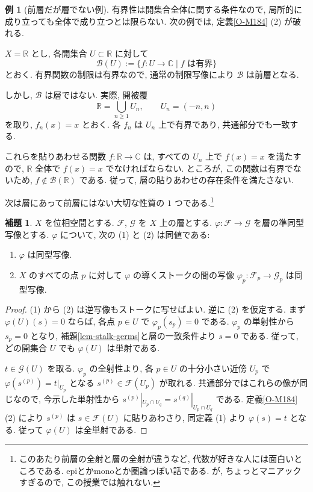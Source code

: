 \documentclass[dvipdfmx,a4paper,11pt]{article} %
\newcommand{\R}{\mathbb{R}}
\newcommand{\C}{\mathbb{C}}
\theoremstyle{definition}
\numberwithin{equation}{section}
\newtheorem{lem}[thm]{補題}
\newtheorem{exa}[thm]{例}
\begin{document}
\begin{exa}[前層だが層でない例]
有界性は開集合全体に関する条件なので, 局所的に成り立っても全体で成り立つとは限らない. 次の例では, 定義\ref{O-M184} (2) が破れる.

$X=\R$ とし, 各開集合 $U\subset\R$ に対して
\[
\mathcal B(U)
:=\{f:U\to\C\mid f\text{ は有界}\}
\]
とおく.
有界関数の制限は有界なので, 通常の制限写像により
$\mathcal B$ は前層となる.

しかし, $\mathcal B$ は層ではない.
実際, 開被覆
\[
\R=\bigcup_{n\geq1}U_n,\qquad U_n=(-n,n)
\]
を取り, $f_n(x)=x$ とおく.
各 $f_n$ は $U_n$ 上で有界であり, 共通部分でも一致する.

これらを貼りあわせる関数 $f:\R\to\C$ は, 
すべての $U_n$ 上で $f(x)=x$ を満たすので, 
$\R$ 全体で $f(x)=x$ でなければならない.
ところが, この関数は有界でないため, 
$f\notin\mathcal B(\R)$ である.
従って, 層の貼りあわせの存在条件を満たさない.
\end{exa}



次は層にあって前層にはない大切な性質の $1$ つである.\footnote{このあたり前層の全射と層の全射が違うなど, 代数が好きな人には面白いところである. epiとかmonoとか圏論っぽい話である. が, ちょっとマニアックすぎるので, この授業では触れない. }

\begin{lem}\label{O-M191}
$X$ を位相空間とする. $\mathcal{F}$, $\mathcal{G}$ を $X$ 上の層とする. $\varphi:\mathcal{F}\to\mathcal{G}$ を層の準同型写像とする. $\varphi$ について, 次の (1) と (2) は同値である:
\begin{enumerate}
\item[(1)]
$\varphi$ は同型写像.
\item[(2)]
$X$ のすべての点 $p$ に対して $\varphi$ の導くストークの間の写像
\(
\varphi_p:\mathcal{F}_p\to\mathcal{G}_p
\)
は同型写像.
\end{enumerate}
\end{lem}
\begin{proof}
(1) から (2) は逆写像もストークに写せばよい. 逆に (2) を仮定する.
まず $\varphi(U)(s)=0$ ならば, 各点 $p\in U$ で
$\varphi_p(s_p)=0$ である. $\varphi_p$ の単射性から $s_p=0$ となり,
補題\ref{lem-stalk-germs}と層の一致条件より $s=0$ である.
従って, どの開集合 $U$ でも $\varphi(U)$ は単射である.

$t\in\mathcal G(U)$ を取る. $\varphi_p$ の全射性より,
各 $p\in U$ の十分小さい近傍 $U_p$ で
$\varphi(s^{(p)})=t|_{U_p}$ となる $s^{(p)}\in\mathcal F(U_p)$ が取れる.
共通部分ではこれらの像が同じなので, 今示した単射性から
$s^{(p)}|_{U_p\cap U_q}=s^{(q)}|_{U_p\cap U_q}$ である.
定義\ref{O-M184} (2) により $s^{(p)}$ は $s\in\mathcal F(U)$ に貼りあわさり,
同定義 (1) より $\varphi(s)=t$ となる. 従って $\varphi(U)$ は全単射である.
\end{proof}
\end{document}
